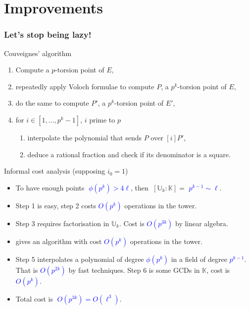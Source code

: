 \documentclass[10pt]{beamer}
\newcommand{\blue}[1]{\textcolor{blue}{#1}}  %
\newcommand{\K}{\mathbb{K}}  %
\newcommand{\U}{\mathbb{U}}  %
\newcommand{\euler}{\phi}  %
\newcommand{\0}{\mathcal{O}}  %
\begin{document}

\section{Improvements}

\begin{frame}
  \frametitle{Let's stop being lazy!}

  \vspace{-1mm}

  \begin{block}{Couveignes' algorithm}
    \begin{enumerate}
    \item Compute a $p$-torsion point of $E$,
    \item repeatedly apply Voloch formulae to compute $P$, a $p^k$-torsion
      point of $E$,
    \item \alert<1>{do the same to compute $P'$, a $p^k$-torsion point
      of $E'$,}
    \item for $i \in [1,\dots,p^k-1]$, $i$ prime to $p$
      \begin{enumerate}
      \item interpolate the polynomial that sends $P$ over $[i]P'$,
      \item deduce a rational fraction and check if its denominator is
        a square.
      \end{enumerate}
    \end{enumerate}
  \end{block}

  \vspace{-1mm}

  \begin{block}{Informal cost analysis (supposing $i_0 = 1$)}
    \begin{itemize}
    \item<0> To have enough points \blue{$\;\euler(p^k) > 4\ell$}, then
      $\;[\U_k:\K] =$ \blue{$p^{k-1} \sim \ell$}.
    \item<0> Step 1 is easy, step 2 costs \blue{$O(p^k)$}
      operations in the tower.
    \item<1> \alert{Step 3 requires factorisation in $\U_k$. Cost is
      \blue{$O(p^{3k})$} by linear algebra.}
    \item<1> \cite{Couveignes00} gives an algorithm with cost
      \blue{$O(p^k)$} operations in the tower.
    \item<0> Step 5 interpolates a polynomial of degree
      \blue{$\euler(p^k)$} in a field of degree \blue{$p^{k-1}$}. That
      is \blue{$O(p^{2k})$} by fast techniques.  Step 6 is some GCDs
      in $\K$, cost is \blue{$O(p^k)$}.
    \item<0> Total cost is \blue{$\;O(p^{3k}) = O(\ell^3)$}.
    \end{itemize}
  \end{block}
\end{frame}
\end{document}
